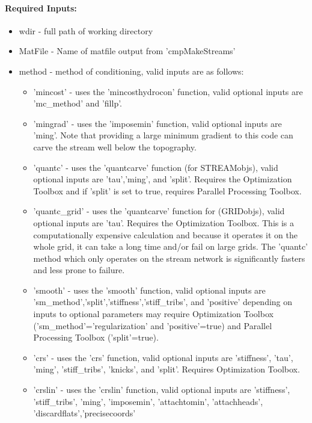\paragraph{Required Inputs:}
\begin{itemize}
\item wdir - full path of working directory
\item MatFile - Name of matfile output from 'cmpMakeStreams'
\item method - method of conditioning, valid inputs are as follows:
\begin{itemize}
\item 'mincost' - uses the 'mincosthydrocon' function, valid optional inputs are 'mc\_method' and 'fillp'.
\item 'mingrad' - uses the 'imposemin' function, valid optional inputs are 'ming'. Note that providing a large minimum gradient
to this code can carve the stream well below the topography.
\item 'quantc' - uses the 'quantcarve' function (for STREAMobjs), valid optional inputs are 'tau','ming', and 'split'. Requires the
Optimization Toolbox and if 'split' is set to true, requires Parallel Processing Toolbox.
\item 'quantc\_grid' - uses the 'quantcarve' function for (GRIDobjs), valid optional inputs are 'tau'. Requires the Optimization Toolbox.
This is a computationally expensive calculation and because it operates it on the whole grid, it can take a long time and/or
fail on large grids. The 'quantc' method which only operates on the stream network is significantly fasters and less prone
to failure.
\item 'smooth' - uses the 'smooth' function, valid optional inputs are 'sm\_method','split','stiffness','stiff\_tribs', and 'positive' depending 
on inputs to optional parameters may require Optimization Toolbox ('sm\_method'='regularization' and 'positive'=true) and Parallel
Processing Toolbox ('split'=true).
\item 'crs' - uses the 'crs' function, valid optional inputs are 'stiffness', 'tau', 'ming', 'stiff\_tribs', 'knicks', and 'split'. Requires
Optimization Toolbox.
\item 'crslin' - uses the 'crslin' function, valid optional inputs are 'stiffness', 'stiff\_tribs', 'ming', 'imposemin', 'attachtomin', 
'attachheads', 'discardflats','precisecoords'
\end{itemize}
\end{itemize}

